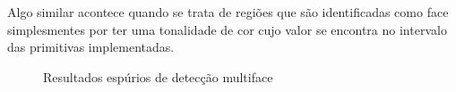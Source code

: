 \documentclass[journal,onecolumn]{IEEEtran}
\begin{document}
	Algo similar acontece quando se trata de regiões que são identificadas como face simplesmentes por ter uma tonalidade de cor cujo valor se encontra no intervalo das primitivas implementadas.	
	
\begin{figure}[htb]
\caption{Resultados espúrios de detecção multiface}
\label{fig:badDetection}
\end{figure} 

	


\end{document}
